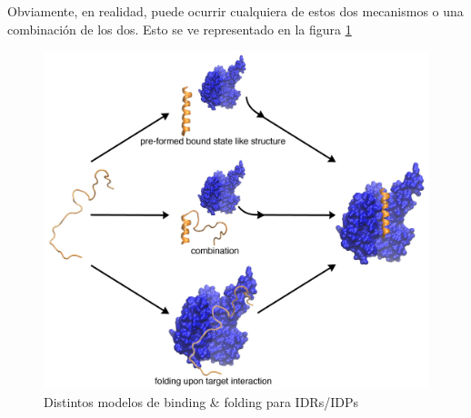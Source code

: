 % 

Obviamente, en realidad, puede ocurrir cualquiera de estos dos mecanismos o una combinación de los dos.
Esto se ve representado en la figura \ref{idpBinding}



\begin{figure}[h]
\centering
\includegraphics[width=\textwidth]{img/PSE-MoRE.jpg} 
\caption{Distintos modelos de binding \& folding para IDRs/IDPs} 
\label{idpBinding}
\end{figure}



